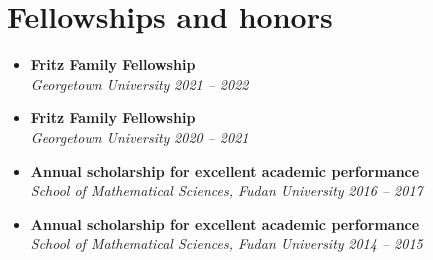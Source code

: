\documentclass[letterpaper,11pt]{article}
\makeatletter
\newcommand{\resumeSubheading}[4]{
  \vspace{-7pt}\item
      \textbf{#1} \hfill #2 \\
      \textit{\small#3} \hfill \textit{\small #4}
  \vspace{-4pt}
}
\newcommand{\resumeSubHeadingListStart}{\begin{itemize}[leftmargin=*]}
\newcommand{\resumeSubHeadingListEnd}{\end{itemize}}
\makeatother
\begin{document}
\section{Fellowships and honors}
  \resumeSubHeadingListStart
    \resumeSubheading
      {Fritz Family Fellowship}{}
      {Georgetown University}{2021 -- 2022}
    \resumeSubheading
      {Fritz Family Fellowship}{}
      {Georgetown University}{2020 -- 2021}
    \resumeSubheading
      {Annual scholarship for excellent academic performance}{}
      {School of Mathematical Sciences, Fudan University}{2016 -- 2017}
    \resumeSubheading
      {Annual scholarship for excellent academic performance}{}
      {School of Mathematical Sciences, Fudan University}{2014 -- 2015}
  \resumeSubHeadingListEnd
\end{document}
